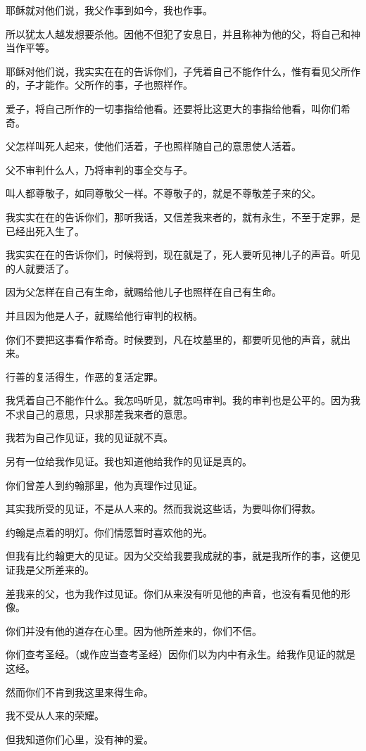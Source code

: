 \documentclass[12pt,oneside]{book}
\begin{document}
耶稣就对他们说，我父作事到如今，我也作事。

所以犹太人越发想要杀他。因他不但犯了安息日，并且称神为他的父，将自己和神当作平等。

耶稣对他们说，我实实在在的告诉你们，子凭着自己不能作什么，惟有看见父所作的，子才能作。父所作的事，子也照样作。

爱子，将自己所作的一切事指给他看。还要将比这更大的事指给他看，叫你们希奇。

父怎样叫死人起来，使他们活着，子也照样随自己的意思使人活着。

父不审判什么人，乃将审判的事全交与子。

叫人都尊敬子，如同尊敬父一样。不尊敬子的，就是不尊敬差子来的父。

我实实在在的告诉你们，那听我话，又信差我来者的，就有永生，不至于定罪，是已经出死入生了。

我实实在在的告诉你们，时候将到，现在就是了，死人要听见神儿子的声音。听见的人就要活了。

因为父怎样在自己有生命，就赐给他儿子也照样在自己有生命。

并且因为他是人子，就赐给他行审判的权柄。

你们不要把这事看作希奇。时候要到，凡在坟墓里的，都要听见他的声音，就出来。

行善的复活得生，作恶的复活定罪。

我凭着自己不能作什么。我怎吗听见，就怎吗审判。我的审判也是公平的。因为我不求自己的意思，只求那差我来者的意思。

我若为自己作见证，我的见证就不真。

另有一位给我作见证。我也知道他给我作的见证是真的。

你们曾差人到约翰那里，他为真理作过见证。

其实我所受的见证，不是从人来的。然而我说这些话，为要叫你们得救。

约翰是点着的明灯。你们情愿暂时喜欢他的光。

但我有比约翰更大的见证。因为父交给我要我成就的事，就是我所作的事，这便见证我是父所差来的。

差我来的父，也为我作过见证。你们从来没有听见他的声音，也没有看见他的形像。

你们并没有他的道存在心里。因为他所差来的，你们不信。

你们查考圣经。（或作应当查考圣经）因你们以为内中有永生。给我作见证的就是这经。

然而你们不肯到我这里来得生命。

我不受从人来的荣耀。

但我知道你们心里，没有神的爱。
\end{document}
